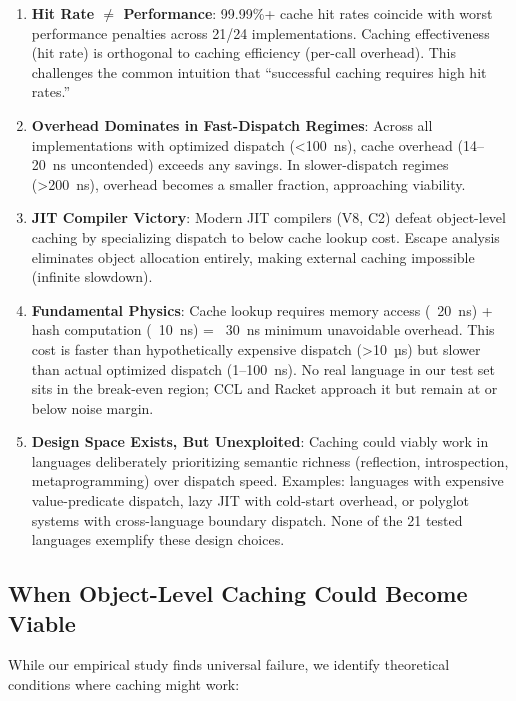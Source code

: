\documentclass[sigplan,final,acmsmall,review,screen]{acmart}
\begin{document}
\begin{enumerate}
  \item \textbf{Hit Rate $\neq$ Performance}: 99.99\%+ cache hit rates coincide with worst performance penalties across 21/24 implementations.
    Caching effectiveness (hit rate) is orthogonal to caching efficiency (per-call overhead). This challenges the common intuition
    that ``successful caching requires high hit rates.''

  \item \textbf{Overhead Dominates in Fast-Dispatch Regimes}: Across all implementations with optimized dispatch (<100~ns),
    cache overhead (14--20~ns uncontended) exceeds any savings. In slower-dispatch regimes (>200~ns), overhead becomes a smaller fraction,
    approaching viability.

  \item \textbf{JIT Compiler Victory}: Modern JIT compilers (V8, C2) defeat object-level caching by specializing dispatch to below cache lookup cost.
    Escape analysis eliminates object allocation entirely, making external caching impossible (infinite slowdown).

  \item \textbf{Fundamental Physics}: Cache lookup requires memory access (~20~ns) + hash computation (~10~ns) = ~30~ns minimum unavoidable overhead.
    This cost is faster than hypothetically expensive dispatch (>10~µs) but slower than actual optimized dispatch (1--100~ns).
    No real language in our test set sits in the break-even region; CCL and Racket approach it but remain at or below noise margin.

  \item \textbf{Design Space Exists, But Unexploited}: Caching could viably work in languages deliberately prioritizing semantic richness
    (reflection, introspection, metaprogramming) over dispatch speed. Examples: languages with expensive value-predicate dispatch,
    lazy JIT with cold-start overhead, or polyglot systems with cross-language boundary dispatch. None of the 21 tested languages
    exemplify these design choices.
\end{enumerate}

\subsection{When Object-Level Caching Could Become Viable}

While our empirical study finds universal failure, we identify theoretical conditions where caching might work:
\end{document}
